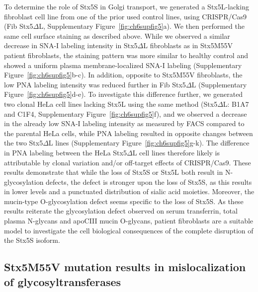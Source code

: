 To determine the role of Stx5S in Golgi transport, we generated a Stx5L-lacking fibroblast cell line from one of the prior used control lines, using CRISPR/Cas9 (Fib Stx5$\Delta$L, Supplementary Figure~\ref{fig:ch6supfig5}a). We then performed the same cell surface staining as described above. While we observed a similar decrease in SNA-I labeling intensity in Stx5$\Delta$L fibroblasts as in Stx5M55V patient fibroblasts, the staining pattern was more similar to healthy control and showed a uniform plasma membrane-localized SNA-I labeling (Supplementary Figure~\ref{fig:ch6supfig5}b-c). In addition, opposite to Stx5M55V fibroblasts, the low PNA labeling intensity was reduced further in Fib Stx5$\Delta$L (Supplementary Figure~\ref{fig:ch6supfig5}d-e). To investigate this difference further, we generated two clonal HeLa cell lines lacking Stx5L using the same method (Stx5$\Delta$L: B1A7 and C1F4, Supplementary Figure~\ref{fig:ch6supfig5}f), and we observed a decrease in the already low SNA-I labeling intensity as measured by FACS compared to the parental HeLa cells, while PNA labeling resulted in opposite changes between the two Stx5$\Delta$L lines (Supplementary Figure~\ref{fig:ch6supfig5}g-k). The difference in PNA labeling between the HeLa Stx5$\Delta$L cell lines therefore likely is attributable by clonal variation and/or off-target effects of CRISPR/Cas9. These results demonstrate that while the loss of Stx5S or Stx5L both result in N-glycosylation defects, the defect is stronger upon the loss of Stx5S, as this results in lower levels and a punctuated distribution of sialic acid moieties. Moreover, the mucin-type O-glycosylation defect seems specific to the loss of Stx5S. As these results reiterate the glycosylation defect observed on serum transferrin, total plasma N-glycans and apoCIII mucin O-glycans, patient fibroblasts are a suitable model to investigate the cell biological consequences of the complete disruption of the Stx5S isoform.

\subsection{Stx5M55V mutation results in mislocalization of glycosyltransferases}

